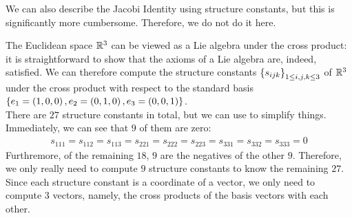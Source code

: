 We can also describe the Jacobi Identity using structure constants, but this is significantly more cumbersome. Therefore, we do not do it here.

\begin{boxexample}
    The Euclidean space $\mathbb{R}^3$ can be viewed as a Lie algebra under the cross product: it is straightforward to show that the axioms of a Lie algebra are, indeed, satisfied. We can therefore compute the structure constants $\left\{ s_{ijk} \right\}_{1 \leq i, j, k \leq 3}$ of $\mathbb{R}^3$ under the cross product with respect to the standard basis $\left\{ e_1 = \left( 1, 0, 0 \right), e_2 = \left( 0, 1, 0 \right), e_3 = \left( 0, 0, 1 \right) \right\}$. \\ %

    There are $27$ structure constants in total, but we can use  to simplify things. Immediately, we can see that $9$ of them are zero:
    \begin{align*}
        s_{111} = s_{112} = s_{113} = s_{221} = s_{222} = s_{223} = s_{331} = s_{332} = s_{333} = 0
    \end{align*}
    Furthremore, of the remaining $18$, $9$ are the negatives of the other $9$. Therefore, we only really need to compute $9$ structure constants to know the remaining $27$. Since each structure constant is a coordinate of a vector, we only need to compute $3$ vectors, namely, the cross products of the basis vectors with each other. \\


\end{boxexample}
